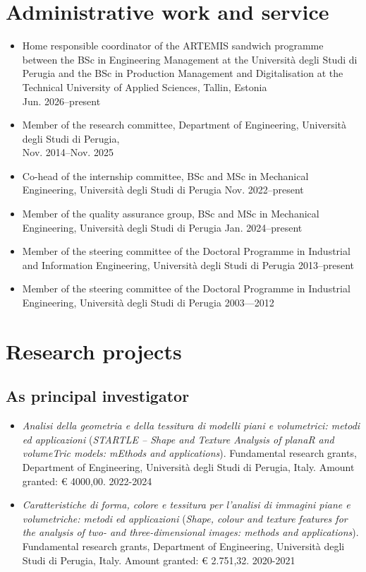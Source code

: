 \documentclass[11pt]{article}
\begin{document}
\section*{Administrative work and service}
\begin{itemize}
	\item Home responsible coordinator of the ARTEMIS sandwich programme between the BSc in Engineering Management at the Università degli Studi di Perugia and the BSc in Production Management and Digitalisation at the Technical University of Applied Sciences, Tallin, Estonia \\ \mbox{} \hfill Jun. 2026--present 
	\item Member of the research committee, Department of Engineering, Università degli Studi di Perugia, \\ \mbox{} \hfill Nov. 2014--Nov. 2025
	\item Co-head of the internship committee, BSc and MSc in Mechanical Engineering, Università degli Studi di Perugia \hfill Nov. 2022--present
	\item Member of the quality assurance group, BSc and MSc in Mechanical Engineering, Università degli Studi di Perugia \hfill Jan. 2024--present
	\item Member of the steering committee of the Doctoral Programme in Industrial and Information Engineering, Università degli Studi di Perugia \hfill 2013--present
	\item Member of the steering committee of the Doctoral Programme in Industrial Engineering, Università degli Studi di Perugia \hfill 2003—2012
\end{itemize}

\section*{Research projects}

\subsection*{As principal investigator}

\begin{itemize}

\item \emph{Analisi della geometria e della tessitura di modelli piani e volumetrici: metodi ed applicazioni} (\emph{STARTLE -- Shape and Texture Analysis of planaR and volumeTric models: mEthods and applications}). Fundamental research grants, Department of Engineering, Università degli Studi di Perugia, Italy. Amount granted: € 4000,00. \hfill 2022-2024

	\item \emph{Caratteristiche di forma, colore e tessitura per l’analisi di immagini piane e volumetriche: metodi ed applicazioni} (\emph{Shape, colour and texture features for the analysis of two- and three-dimensional images: methods and applications}). Fundamental research grants, Department of Engineering, Università degli Studi di Perugia, Italy. Amount granted: € 2.751,32. \hfill 2020-2021
\end{itemize}
\end{document}
